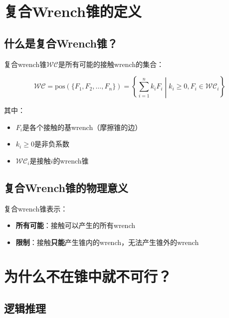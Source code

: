 \documentclass[12pt,a4paper]{article}
\begin{document}
\section{复合Wrench锥的定义}

\subsection{什么是复合Wrench锥？}

复合wrench锥$\mathcal{WC}$是所有可能的接触wrench的集合：

\begin{equation}
\mathcal{WC} = \text{pos}(\{F_1, F_2, \ldots, F_n\}) = \left\{\sum_{i=1}^n k_i F_i \middle| k_i \geq 0, F_i \in \mathcal{WC}_i \right\}
\end{equation}

其中：
\begin{itemize}
    \item $F_i$是各个接触的基wrench（摩擦锥的边）
    \item $k_i \geq 0$是非负系数
    \item $\mathcal{WC}_i$是接触$i$的wrench锥
\end{itemize}

\subsection{复合Wrench锥的物理意义}

复合wrench锥表示：
\begin{itemize}
    \item \textbf{所有可能}：接触可以产生的所有wrench
    \item \textbf{限制}：接触\textbf{只能}产生锥内的wrench，无法产生锥外的wrench
\end{itemize}

\section{为什么不在锥中就不可行？}

\subsection{逻辑推理}
\end{document}
